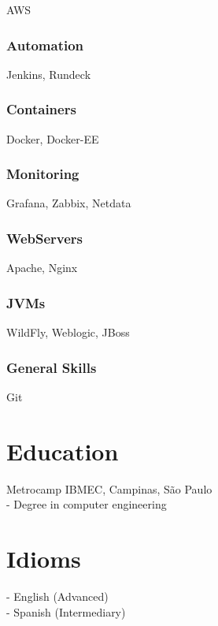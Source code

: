 \documentclass{article}
\begin{document}
AWS

\subsubsection{Automation}

Jenkins, Rundeck

\subsubsection{Containers}

Docker, Docker-EE

\subsubsection{Monitoring}

Grafana, Zabbix, Netdata

\subsubsection{WebServers}

Apache, Nginx

\subsubsection{JVMs}

WildFly, Weblogic, JBoss

\subsubsection{General Skills}

Git

\section{Education}

Metrocamp IBMEC, Campinas, São Paulo \\
- Degree in computer engineering

\section{Idioms}

- English (Advanced) \\
- Spanish (Intermediary)
\end{document}
